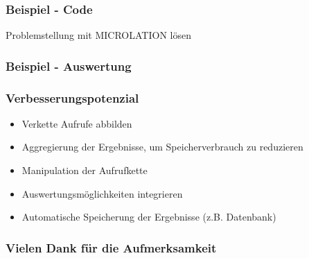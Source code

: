 \begin{frame}
    \frametitle{Beispiel - Code}
    Problemstellung mit MICROLATION lösen
\end{frame}

\begin{frame}
    \frametitle{Beispiel - Auswertung}
\end{frame}


\begin{frame}
    \frametitle{Verbesserungspotenzial}
    \begin{itemize}
        \item Verkette Aufrufe abbilden
        \item Aggregierung der Ergebnisse, um Speicherverbrauch zu reduzieren
        \item Manipulation der Aufrufkette
        \item Auswertungsmöglichkeiten integrieren
        \item Automatische Speicherung der Ergebnisse (z.B. Datenbank)
    \end{itemize}
\end{frame}


\begin{frame}
    \frametitle{Vielen Dank für die Aufmerksamkeit}
\end{frame}
